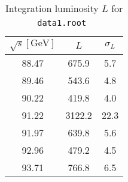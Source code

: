 \begin{table}[ht]
	\centering
	\begin{tabular}{ccc}
		\toprule
	$\sqrt{s} [\si{\giga\eV}]$ &  $L$ &  $\sigma_L$ \\
	\midrule
	\num{88.47} & \num{675.9} & \num{5.7}\\
	\num{89.46} & \num{543.6} & \num{4.8}\\
	\num{90.22} & \num{419.8} & \num{4.0}\\
	\num{91.22} & \num{3122.2} & \num{22.3}\\
	\num{91.97} & \num{639.8} & \num{5.6}\\
	\num{92.96} & \num{479.2} & \num{4.5}\\
	\num{93.71} & \num{766.8} & \num{6.5}\\
	\bottomrule
	\end{tabular}
	\cprotect\caption{Integration luminosity $L$ for \verb|data1.root|~\cite{manual}}
	\label{tab:label}
\end{table}

